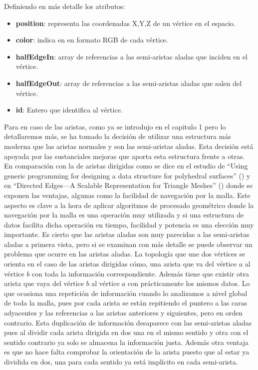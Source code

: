 Definiendo en más detalle los atributos:
\begin{itemize}
	\item \textbf{position}: representa las coordenadas X,Y,Z de un vértice en el espacio.
	\item \textbf{color}: indica en en formato RGB de cada vértice.
	\item \textbf{halfEdgeIn}: array de referencias a las semi-aristas aladas que inciden en el vértice.
	\item \textbf{halfEdgeOut}: array de referencias a las semi-aristas aladas que salen del vértice.
	\item \textbf{id}: Entero que identifica al vértice.
\end{itemize}

Para en caso de las aristas, como ya se introdujo en el capitulo 1 pero lo detallaremos más, se ha tomado la decisión de utilizar una estructura más moderna que las aristas normales y son las semi-aristas aladas. Esta decisión está apoyada por las sustanciales mejoras que aporta esta estructura frente a otras. En comparación con la de aristas dirigidas como se dice en el estudio de ``Using generic programming for designing a data structure for polyhedral surfaces'' (\cite{kettnerUsingGenericProgramming1999}) y en ``Directed Edges—A Scalable Representation for Triangle Meshes'' (\cite{campagnaDirectedEdgesScalable1998}) donde se exponen las ventajas, algunas como la facilidad de navegación por la malla. Este aspecto es clave a la hora de aplicar algoritmos de procesado geométrico donde la navegación por la malla es una operación muy utilizada y si una estructura de datos facilita dicha operación en tiempo, facilidad y potencia es una elección muy importante. Es cierto que las aristas aladas son muy parecidas a las semi-aristas aladas a primera vista, pero si se examinan con más detalle se puede observar un problema que ocurre en las aristas aladas. La topología que une dos vértices se orienta en el caso de las aristas dirigidas cómo, una arista que va del vértice $a$ al vértice $b$ con toda la información correspondiente. Además tiene que existir otra arista que vaya del vértice $b$ al vértice $a$ con prácticamente los mismos datos. Lo que ocasiona una repetición de información cuando lo analizamos a nivel global de toda la malla, pues por cada arista se están repitiendo el puntero a las caras adyacentes y las referencias a las aristas anteriores y siguientes, pero en orden contrario. Esta duplicación de información desaparece con las semi-aristas aladas pues al dividir cada arista dirigida en dos una en el mismo sentido y otra con el sentido contrario ya solo se almacena la información justa. Además otra ventaja es que no hace falta comprobar la orientación de la arista puesto que al estar ya dividida en dos, una para cada sentido ya está implícito en cada semi-arista. \\

